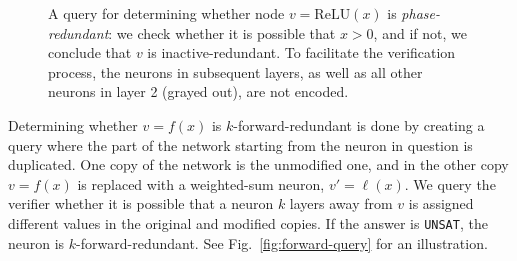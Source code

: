 \documentclass[10pt, conference, twocolumn, compsocconf]{IEEEtran}
\theoremstyle{remark}
\newcommand{\relu}{\text{ReLU}\xspace}
\newcommand{\kfr}{$k$-forward-redundant}
\newcommand{\unsat}{\texttt{UNSAT}}
\begin{document}
\begin{figure}[htp]
{
}
\caption {A query for determining whether \relu{} node $v=\relu{}(x)$ is
  \emph{phase-redundant}: we check whether it is possible that
  $x>0$, and if not, we conclude that $v$ is inactive-redundant.
  To facilitate the verification process, the neurons in subsequent layers, as
  well as all other neurons in layer 2 (grayed out), are not encoded.}
\label{fig:inactive_query}
\end{figure}

Determining whether $v=f(x)$  is \kfr{} is done by
creating a query where the part of the network starting from the
neuron in question is duplicated. One copy of the network is the
unmodified one, and in the other copy $v=f(x)$ is replaced with a
weighted-sum neuron, $v'=\ell(x)$.   We query the verifier whether it
is possible that a neuron $k$ layers away from $v$ is assigned 
different values in the original and modified copies. If the answer is
\unsat{}, the neuron is \kfr{}. See Fig.~\ref{fig:forward-query}
for an illustration.
\end{document}
